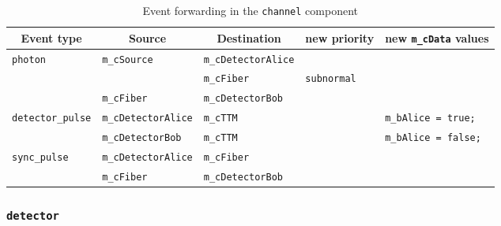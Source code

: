 \begin{table}[H]
\begin{tabular}{ | l | l || l | l | p{4cm} | }
\hline
\multicolumn{1}{|c|}{\textbf{Event type}} & \multicolumn{1}{c||}{\textbf{Source}} & \multicolumn{1}{c|}{\textbf{Destination}} & \multicolumn{1}{c|}{\textbf{new priority}} & \multicolumn{1}{c|}{\textbf{new \texttt{m\_cData} values}} \\
\hline \hline
\texttt{photon} & \texttt{m\_cSource} & \texttt{m\_cDetectorAlice} &  & \\
\cline{3-5}
 & & \texttt{m\_cFiber} & \texttt{subnormal} & \\
\cline{2-5}
 & \texttt{m\_cFiber} & \texttt{m\_cDetectorBob} & & \\
\hline
\texttt{detector\_pulse} & \texttt{m\_cDetectorAlice} & \texttt{m\_cTTM} & & \texttt{m\_bAlice = true;} \\
\cline{2-5}
 & \texttt{m\_cDetectorBob} & \texttt{m\_cTTM} & & \texttt{m\_bAlice = false;} \\
\hline
\texttt{sync\_pulse} & \texttt{m\_cDetectorAlice}  & \texttt{m\_cFiber} & & \\
\cline{2-5}
 & \texttt{m\_cFiber}  & \texttt{m\_cDetectorBob} & & \\
\hline
\end{tabular}
\caption{Event forwarding in the \texttt{channel} component}
\label{tab:comp_channel_evfwd}
\end{table}

\subsubsection{\texttt{detector}}
\label{subsubsec:comp_detector}

